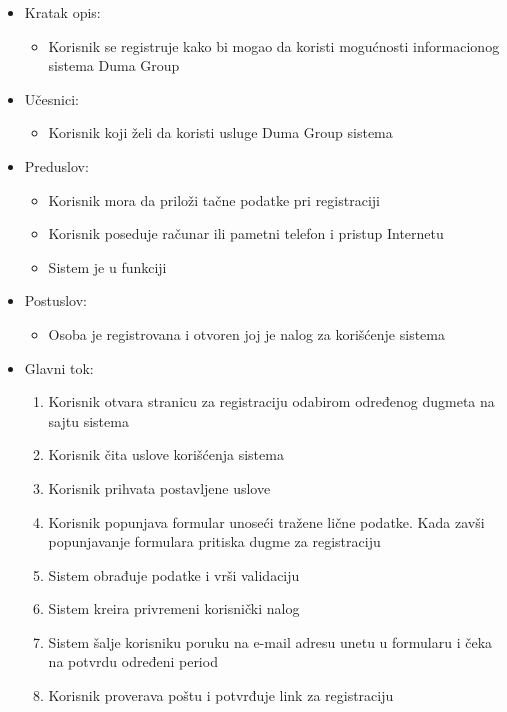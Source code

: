 \documentclass[a4paper]{article}
\begin{document}
\begin{itemize}
    \item Kratak opis:
        \begin{itemize}
            \item Korisnik se registruje kako bi mogao da koristi mogućnosti informacionog sistema Duma Group
        \end{itemize}
    \item Učesnici:
        \begin{itemize}
            \item Korisnik koji želi da koristi usluge Duma Group sistema
        \end{itemize}
    \item Preduslov:
        \begin{itemize}
            \item Korisnik mora da priloži tačne podatke pri registraciji
            \item Korisnik poseduje računar ili pametni telefon i pristup Internetu
            \item Sistem je u funkciji
        \end{itemize}
    \item Postuslov:
        \begin{itemize}
            \item Osoba je registrovana i otvoren joj je nalog za korišćenje sistema
        \end{itemize}
    \item Glavni tok:
        \begin{enumerate}
            \item  Korisnik otvara stranicu za registraciju odabirom određenog dugmeta na sajtu sistema
            \item Korisnik čita uslove korišćenja sistema 
            \item Korisnik prihvata postavljene uslove
            \item Korisnik popunjava formular unoseći tražene lične podatke. Kada zavši popunjavanje formulara pritiska dugme za registraciju
            \item Sistem obrađuje podatke i vrši validaciju
            \item Sistem kreira privremeni korisnički nalog
            \item Sistem šalje korisniku poruku na e-mail adresu unetu u formularu i čeka na potvrdu određeni period
            \item Korisnik proverava poštu i potvrđuje link za registraciju

\end{enumerate}
\end{itemize}
\end{document}
